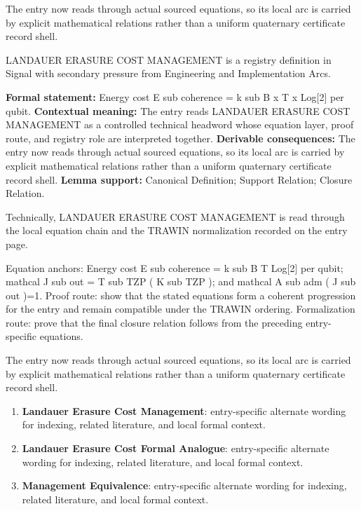The entry now reads through actual sourced equations, so its local arc is carried by explicit mathematical relations rather than a uniform quaternary certificate record shell.
\clearpage


\begingroup\small
{}
LANDAUER ERASURE COST MANAGEMENT is a registry definition in Signal with secondary pressure from Engineering and Implementation Arcs.

\begingroup\footnotesize\setlength{\emergencystretch}{3em}\sloppy
\textbf{Formal statement:} Energy cost E sub coherence = k sub B x T x Log[2] per qubit. \textbf{Contextual meaning:} The entry reads LANDAUER ERASURE COST MANAGEMENT as a controlled technical headword whose equation layer, proof route, and registry role are interpreted together. \textbf{Derivable consequences:} The entry now reads through actual sourced equations, so its local arc is carried by explicit mathematical relations rather than a uniform quaternary certificate record shell. \textbf{Lemma support:} Canonical Definition; Support Relation; Closure Relation.\par
\endgroup

Technically, LANDAUER ERASURE COST MANAGEMENT is read through the local equation chain and the TRAWIN normalization recorded on the entry page.

Equation anchors: Energy cost E sub coherence = k sub B T Log[2] per qubit; mathcal J sub out = T sub TZP ( K sub TZP ); and mathcal A sub adm ( J sub out )=1. Proof route: show that the stated equations form a coherent progression for the entry and remain compatible under the TRAWIN ordering. Formalization route: prove that the final closure relation follows from the preceding entry-specific equations.

The entry now reads through actual sourced equations, so its local arc is carried by explicit mathematical relations rather than a uniform quaternary certificate record shell.
\endgroup

\begin{enumerate}[leftmargin=1.6em,itemsep=6pt,topsep=4pt]
\item \textbf{Landauer Erasure Cost Management}: entry-specific alternate wording for indexing, related literature, and local formal context.
\item \textbf{Landauer Erasure Cost Formal Analogue}: entry-specific alternate wording for indexing, related literature, and local formal context.
\item \textbf{Management Equivalence}: entry-specific alternate wording for indexing, related literature, and local formal context.
\end{enumerate}


